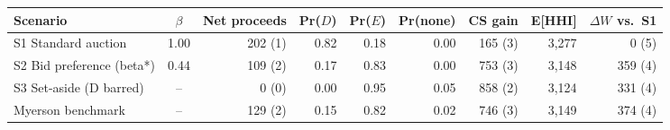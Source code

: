 \begin{tabular}{lcrrrrrrr}
\toprule
Scenario & $\beta$ & Net proceeds & Pr($D$) & Pr($E$) & Pr(none) & CS gain & E[HHI] & $\Delta W$ vs.\ S1 \\
\midrule
S1 Standard auction & 1.00 & 202 (1) & 0.82 & 0.18 & 0.00 & 165 (3) & 3,277 & 0 (5) \\
S2 Bid preference (beta*) & 0.44 & 109 (2) & 0.17 & 0.83 & 0.00 & 753 (3) & 3,148 & 359 (4) \\
S3 Set-aside (D barred) & -- & 0 (0) & 0.00 & 0.95 & 0.05 & 858 (2) & 3,124 & 331 (4) \\
Myerson benchmark & -- & 129 (2) & 0.15 & 0.82 & 0.02 & 746 (3) & 3,149 & 374 (4) \\
\bottomrule
\end{tabular}
